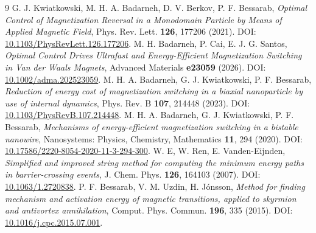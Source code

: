 \documentclass[11pt]{article}
\newcommand{\doi}[1]{DOI: \href{https://doi.org/#1}{#1}}
\begin{document}
\begin{thebibliography}{9}
 G. J. Kwiatkowski, M. H. A. Badarneh, D. V. Berkov, P. F. Bessarab,
\emph{Optimal Control of Magnetization Reversal in a Monodomain Particle by Means of Applied Magnetic
Field}, Phys. Rev. Lett. \textbf{126}, 177206 (2021). \doi{10.1103/PhysRevLett.126.177206}.
 M. H. Badarneh, P. Cai, E. J. G. Santos,
\emph{Optimal Control Drives Ultrafast and Energy-Efficient Magnetization Switching in Van der Waals
Magnets}, Advanced Materials \textbf{e23059} (2026). \doi{10.1002/adma.202523059}.
 M. H. A. Badarneh, G. J. Kwiatkowski, P. F. Bessarab,
\emph{Reduction of energy cost of magnetization switching in a biaxial nanoparticle by use of internal
dynamics}, Phys. Rev. B \textbf{107}, 214448 (2023). \doi{10.1103/PhysRevB.107.214448}.
 M. H. A. Badarneh, G. J. Kwiatkowski, P. F. Bessarab,
\emph{Mechanisms of energy-efficient magnetization switching in a bistable nanowire}, Nanosystems:
Physics, Chemistry, Mathematics \textbf{11}, 294 (2020). \doi{10.17586/2220-8054-2020-11-3-294-300}.
 W. E, W. Ren, E. Vanden-Eijnden,
\emph{Simplified and improved string method for computing the minimum energy paths in barrier-crossing
events}, J. Chem. Phys. \textbf{126}, 164103 (2007). \doi{10.1063/1.2720838}.
 P. F. Bessarab, V. M. Uzdin, H. J\'onsson,
\emph{Method for finding mechanism and activation energy of magnetic transitions, applied to skyrmion
and antivortex annihilation}, Comput. Phys. Commun. \textbf{196}, 335 (2015).
\doi{10.1016/j.cpc.2015.07.001}.
\end{thebibliography}
\end{document}

